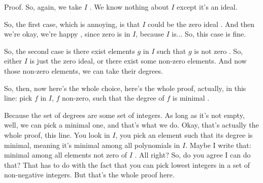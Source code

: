 \begin{proofWrapper}

\begin{speech}[00:34:09 - 00:35:48]
Proof.  So, again, we take $I$ . We know nothing about $I$ except it's an ideal.

So, the first case, which is annoying, is that $I$ could be the zero ideal . And then we're okay, we're happy , since zero is in $I$, because $I$ is... So, this case is fine.

So, the second case is there exist elements $g$ in $I$ such that $g$ is not zero . So, either $I$ is just the zero ideal, or there exist some non-zero elements. And now those non-zero elements, we can take their degrees.

So, then, now here's the whole choice, here's the whole proof, actually, in this line: pick $f$ in $I$, $f$ non-zero, such that the degree of $f$ is minimal .

Because the set of degrees are some set of integers. As long as it's not empty, well, we can pick a minimal one, and that's what we do. Okay, that's actually the whole proof, this line. You look in $I$, you pick an element such that its degree is minimal, meaning it's minimal among all polynomials in $I$. Maybe I write that: minimal among all elements not zero of $I$ . All right? So, do you agree I can do that? That has to do with the fact that you can pick lowest integers in a set of non-negative integers. But that's the whole proof here.
\end{speech}

\begin{hidden}
\end{hidden}


\end{proofWrapper}
